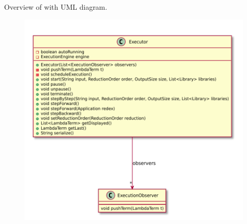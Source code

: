 Overview of \texttt{\pkg} with UML diagram.

\begin{figure}[H]
	\centering
	\includegraphics[width=\textwidth]{packageDiagrams/executionPackage}
\end{figure}

